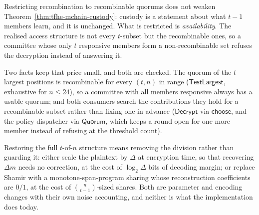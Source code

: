 \begin{remark}
\label{rem:tfhe-access-structure}
Restricting recombination to recombinable quorums does not weaken
Theorem~\ref{thm:tfhe-mchain-custody}: custody is a statement about what
$t-1$ members learn, and it is unchanged. What is restricted is
\emph{availability}. The realised access structure is not every $t$-subset but
the recombinable ones, so a committee whose only $t$ responsive members form a
non-recombinable set refuses the decryption instead of answering it.

Two facts keep that price small, and both are checked. The quorum of the $t$
largest positions is recombinable for every $(t,n)$ in range
($\mathsf{TestLargest}$, exhaustive
for $n \le 24$), so a committee with all members responsive always has a usable
quorum; and both consumers search the contributions they hold for a
recombinable subset rather than fixing one in advance
($\mathsf{Decrypt}$ via $\mathsf{choose}$, and the policy dispatcher via
$\mathsf{Quorum}$, which keeps a round open for one more member instead of
refusing at the threshold count).

Restoring the full $t$-of-$n$ structure means removing the division rather than
guarding it: either scale the plaintext by $\Delta$ at encryption time, so that
recovering $\Delta m$ needs no correction, at the cost of $\log_2 \Delta$ bits
of decoding margin; or replace Shamir with a monotone-span-program sharing
whose reconstruction coefficients are $0/1$, at the cost of
$\binom{n}{t-1}$-sized shares. Both are parameter and encoding changes with
their own noise accounting, and neither is what the implementation does today.
\end{remark}

